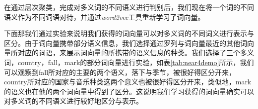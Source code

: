 在通过层次聚类，完成对多义词的不同语义进行判别后，我们现在将一个词的不同语义作为不同词语对待，并通过\emph{word2vec}工具重新学习了词向量。

下面那我们通过实验来说明我们获得的词向量可以对多义词的不同词义进行表示与区分。由于词向量携带部分语义信息，我们选择通过罗列与词向量最近的其他词向量所对应的词语，来展示词向量的所携带的语义信息的种类。我们选择了三个多义词，country，fall，mark的部分词向量进行实验，如表\ref{tab:near4demo}所示，我们可以观察到fall所对应的主要的两个语义，落下与季节，被很好得区分开来，country所对应的国家与音乐种类这两个意义也被很好得区分开来，类似地，mark的语义也在他的两个词向量中得到了区分。这说明我们学习获得的词向量确实可以对多义词的不同语义进行较好地区分与表示。